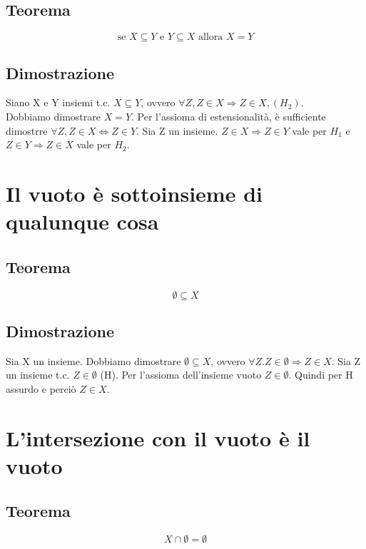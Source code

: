 \documentclass[12pt]{article}
\begin{document}
\subsection{Teorema}
\begin{equation}
    \text{se } X \subseteq Y \text{ e } Y \subseteq X \text{ allora } X = Y \label{teo:anti-simmetria_subseteq}
\end{equation}
\subsection{Dimostrazione}
Siano X e Y insiemi t.c. $X \subseteq Y$, ovvero $\forall Z, Z \in X \Rightarrow Z \in X, (H_2)$.\\
Dobbiamo dimostrare $X = Y$. Per l'assioma di estensionalità, è sufficiente dimostrre $\forall Z, Z \in X \Leftrightarrow Z \in Y$. Sia Z un insieme. $Z \in X \Rightarrow Z \in Y$ vale per $H_1$ e $Z \in Y \Rightarrow Z \in X$ vale per $H_2$.
\section{Il vuoto è sottoinsieme di qualunque cosa}
\subsection{Teorema}
\begin{equation}
    \emptyset \subseteq X \label{teo:vuoto_subset_tutto}
\end{equation}
\subsection{Dimostrazione}
Sia X un insieme. Dobbiamo dimostrare $\emptyset \subseteq X$, ovvero $\forall Z. Z \in \emptyset \Rightarrow Z \in X$. Sia Z un insieme t.c. $Z \in \emptyset$ (H). Per l'assioma dell'insieme vuoto $Z \in \emptyset$. Quindi per H assurdo e perciò $Z \in X$.
\section{L'intersezione con il vuoto è il vuoto}
\subsection{Teorema}
\begin{equation}
    X \cap \emptyset = \emptyset \label{teo:intersezione_vuoto}
\end{equation}
\end{document}
